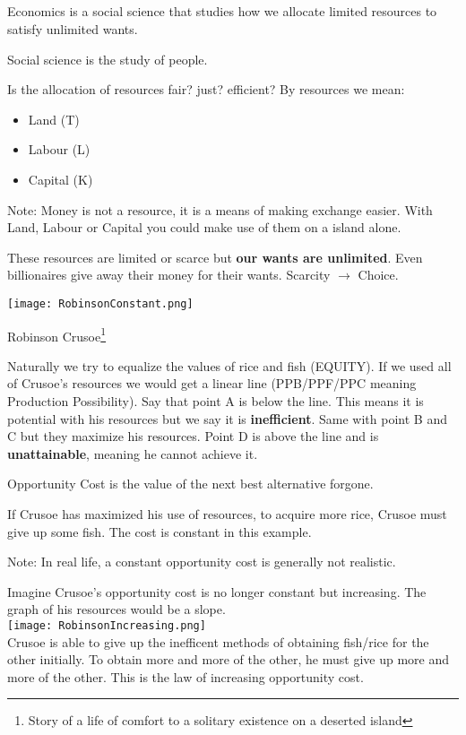 
\subsection{}
\begin{definition}
    Economics is a social science that studies how we allocate limited resources
    to satisfy unlimited wants.
\end{definition}
\begin{definition}
    Social science is the study of people.
\end{definition}
Is the allocation of resources fair? just? efficient?
By resources we mean:
\begin{itemize}
    \item Land (T)
    \item Labour (L)
    \item Capital (K) 
\end{itemize}
Note: Money is not a resource, it is a means of making exchange easier.
With Land, Labour or Capital you could make use of them on a island alone.

These resources are limited or scarce but \textbf{our wants are unlimited}. Even billionaires give away their money for their wants.
Scarcity $\rightarrow$ Choice.
\newpage

\texttt{[image: RobinsonConstant.png]}\\
\begin{center}
    Robinson Crusoe\footnote[1]{Story of a life of comfort to a solitary existence on a deserted island}\\
\end{center}
Naturally we try to equalize the values of rice and fish (EQUITY).
If we used all of Crusoe's resources we would get a linear line (PPB/PPF/PPC meaning Production Possibility). Say that point A is below the line. This means it is potential with his resources but we say it is \textbf{inefficient}.
Same with point B and C but they maximize his resources. Point D is above the line and is \textbf{unattainable}, meaning he cannot achieve it.

\begin{definition}
    Opportunity Cost is the value of the next best alternative forgone.
    \begin{example}
    If Crusoe has maximized his use of resources, to acquire more rice, Crusoe must give up some fish.
    The cost is constant in this example.
    \end{example}
    Note: In real life, a constant opportunity cost is generally not realistic.
\end{definition}
\newpage
Imagine Crusoe's opportunity cost is no longer constant but increasing.
The graph of his resources would be a slope.\\
\texttt{[image: RobinsonIncreasing.png]}\\
Crusoe is able to give up the inefficent methods of obtaining fish/rice for the other initially.
To obtain more and more of the other, he must give up more and more of the other. This is the law of increasing opportunity cost.
